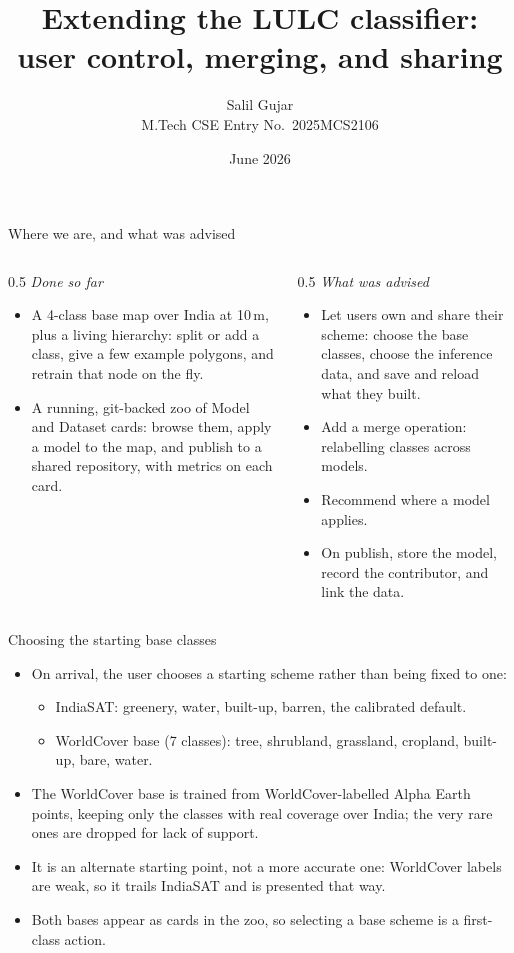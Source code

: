 \documentclass[aspectratio=169]{beamer}
\title[An ownable, shareable LULC classifier]{Extending the LULC classifier: user control, merging, and sharing}
\author[Salil Gujar]{Salil Gujar \\ \footnotesize M.Tech CSE \quad Entry No.\ 2025MCS2106}
\date{June 2026}
\begin{document}
\frame{\titlepage}

\begin{frame}{Where we are, and what was advised}
\begin{columns}[T]
\begin{column}{0.5\textwidth}
\emph{Done so far}
\begin{itemize}\small
  \item A 4-class base map over India at 10\,m, plus a living hierarchy: split or add a class,
  give a few example polygons, and retrain that node on the fly.
  \item A running, git-backed zoo of Model and Dataset cards: browse them, apply a model to the
  map, and publish to a shared repository, with metrics on each card.
\end{itemize}
\end{column}
\begin{column}{0.5\textwidth}
\emph{What was advised}
\begin{itemize}\small
  \item Let users own and share their scheme: choose the base classes, choose the inference
  data, and save and reload what they built.
  \item Add a merge operation: relabelling classes across models.
  \item Recommend where a model applies.
  \item On publish, store the model, record the contributor, and link the data.
\end{itemize}
\end{column}
\end{columns}
\end{frame}

\begin{frame}{Choosing the starting base classes}
\begin{itemize}
  \item On arrival, the user chooses a starting scheme rather than being fixed to one:
  \begin{itemize}\small
    \item IndiaSAT: greenery, water, built-up, barren, the calibrated default.
    \item WorldCover base (7 classes): tree, shrubland, grassland, cropland, built-up, bare, water.
  \end{itemize}
  \item The WorldCover base is trained from WorldCover-labelled Alpha Earth points, keeping
  only the classes with real coverage over India; the very rare ones are dropped for lack of
  support.
  \item It is an alternate starting point, not a more accurate one: WorldCover labels are weak,
  so it trails IndiaSAT and is presented that way.
  \item Both bases appear as cards in the zoo, so selecting a base scheme is a first-class
  action.
\end{itemize}
\end{frame}
\end{document}
